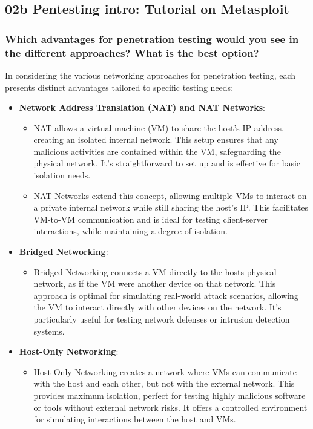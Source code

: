 \subsection{02b Pentesting intro: Tutorial on Metasploit}


\subsubsection{Which advantages for penetration testing would you see in the different approaches? What is the best option?}

In considering the various networking approaches for penetration testing, each presents distinct advantages tailored to specific testing needs:

\begin{itemize}
    \item \textbf{Network Address Translation (NAT) and NAT Networks}:
          \begin{itemize}
              \item NAT allows a virtual machine (VM) to share the host's IP address,
                    creating an isolated internal network. This setup ensures that any malicious
                    activities are contained within the VM, safeguarding the physical network.
                    It's straightforward to set up and is effective for basic isolation needs.
              \item NAT Networks extend this concept, allowing multiple VMs to interact on a private internal network while still sharing the host's IP.
                    This facilitates VM-to-VM communication and is ideal for testing client-server interactions, while maintaining a degree of isolation.
          \end{itemize}
    \item \textbf{Bridged Networking}:
          \begin{itemize}
              \item Bridged Networking connects a VM directly to the hosts physical network, as if the VM were another device on that network.
                    This approach is optimal for simulating real-world attack scenarios, allowing the VM to interact directly with other devices on the network.
                    It's particularly useful for testing network defenses or intrusion detection systems.
          \end{itemize}
    \item \textbf{Host-Only Networking}:
          \begin{itemize}
              \item Host-Only Networking creates a network where VMs can communicate with the host and each other, but not with the external network.
                    This provides maximum isolation, perfect for testing highly malicious software or tools without external network risks.
                    It offers a controlled environment for simulating interactions between the host and VMs.
          \end{itemize}
\end{itemize}

